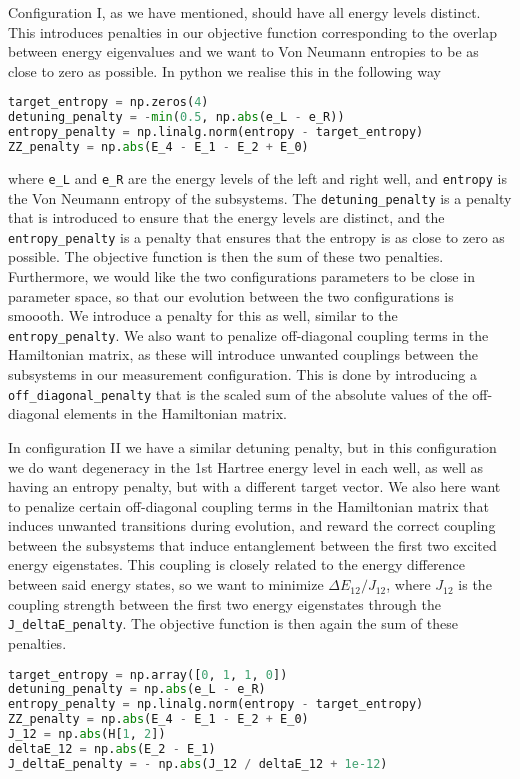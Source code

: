 \documentclass{subfiles}
\begin{document}
Configuration I, as we have mentioned, should have all energy levels distinct. This introduces penalties in our objective function corresponding to the overlap between energy eigenvalues and we want to Von Neumann entropies to be as close to zero as possible. In python we realise this in the following way
\begin{lstlisting}[language=Python]
target_entropy = np.zeros(4)
detuning_penalty = -min(0.5, np.abs(e_L - e_R))
entropy_penalty = np.linalg.norm(entropy - target_entropy)
ZZ_penalty = np.abs(E_4 - E_1 - E_2 + E_0)
\end{lstlisting}
where \texttt{e\_L} and \texttt{e\_R} are the energy levels of the left and right well, and \texttt{entropy} is the Von Neumann entropy of the subsystems. The \texttt{detuning\_penalty} is a penalty that is introduced to ensure that the energy levels are distinct, and the \texttt{entropy\_penalty} is a penalty that ensures that the entropy is as close to zero as possible. The objective function is then the sum of these two penalties. Furthermore, we would like the two configurations parameters to be close in parameter space, so that our evolution between the two configurations is smoooth. We introduce a penalty for this as well, similar to the \texttt{entropy\_penalty}. We also want to penalize off-diagonal coupling terms in the Hamiltonian matrix, as these will introduce unwanted couplings between the subsystems in our measurement configuration. This is done by introducing a \texttt{off\_diagonal\_penalty} that is the scaled sum of the absolute values of the off-diagonal elements in the Hamiltonian matrix.

In configuration II we have a similar detuning penalty, but in this configuration we do want degeneracy in the 1st Hartree energy level in each well, as well as having an entropy penalty, but with a different target vector. We also here want to penalize certain off-diagonal coupling terms in the Hamiltonian matrix that induces unwanted transitions during evolution, and reward the correct coupling between the subsystems that induce entanglement between the first two excited energy eigenstates. This coupling is closely related to the energy difference between said energy states, so we want to minimize $\Delta E_{12} / J_{12}$, where $J_{12}$ is the coupling strength between the first two energy eigenstates through the \texttt{J\_deltaE\_penalty}. 
The objective function is then again the sum of these penalties.
\begin{lstlisting}[language=Python]
target_entropy = np.array([0, 1, 1, 0])
detuning_penalty = np.abs(e_L - e_R)
entropy_penalty = np.linalg.norm(entropy - target_entropy)
ZZ_penalty = np.abs(E_4 - E_1 - E_2 + E_0)
J_12 = np.abs(H[1, 2])  
deltaE_12 = np.abs(E_2 - E_1)  
J_deltaE_penalty = - np.abs(J_12 / deltaE_12 + 1e-12)  
\end{lstlisting}
\end{document}
